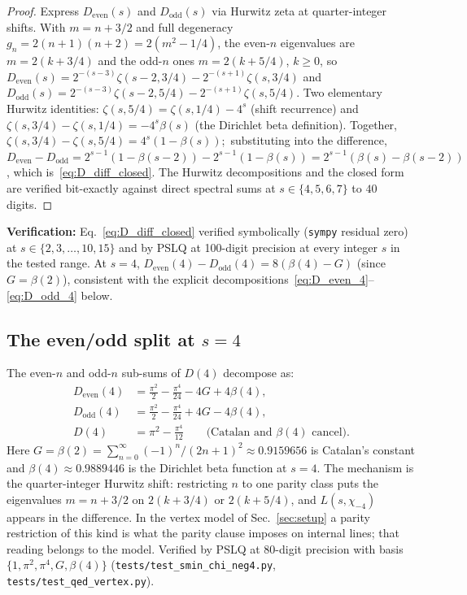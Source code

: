 \documentclass[11pt]{article}
\begin{document}
\begin{proof}
Express $D_{\mathrm{even}}(s)$ and $D_{\mathrm{odd}}(s)$ via Hurwitz
zeta at quarter-integer shifts.  With $m = n + 3/2$ and full
degeneracy $g_n = 2(n+1)(n+2) = 2(m^2 - 1/4)$, the even-$n$
eigenvalues are $m = 2(k + 3/4)$ and the odd-$n$ ones
$m = 2(k + 5/4)$, $k \ge 0$, so
$D_{\mathrm{even}}(s) = 2^{-(s-3)} \zeta(s{-}2, 3/4)
                       - 2^{-(s+1)} \zeta(s, 3/4)$
and
$D_{\mathrm{odd}}(s) = 2^{-(s-3)} \zeta(s{-}2, 5/4)
                       - 2^{-(s+1)} \zeta(s, 5/4)$.
Two elementary Hurwitz identities:
$\zeta(s, 5/4) = \zeta(s, 1/4) - 4^s$ (shift recurrence) and
$\zeta(s, 3/4) - \zeta(s, 1/4) = -4^s \beta(s)$ (the Dirichlet
beta definition).  Together,
$\zeta(s, 3/4) - \zeta(s, 5/4) = 4^s(1 - \beta(s))$;\ substituting
into the difference,
$D_{\mathrm{even}} - D_{\mathrm{odd}}
 = 2^{s-1}(1 - \beta(s{-}2)) - 2^{s-1}(1 - \beta(s))
 = 2^{s-1}(\beta(s) - \beta(s{-}2))$,
which is~\eqref{eq:D_diff_closed}.  The Hurwitz decompositions and
the closed form are verified bit-exactly against direct spectral sums
at $s \in \{4, 5, 6, 7\}$ to $40$ digits.
\end{proof}

\noindent\textbf{Verification:}
Eq.~\eqref{eq:D_diff_closed} verified symbolically (\texttt{sympy}
residual zero) at $s \in \{2, 3, \ldots, 10, 15\}$ and by PSLQ at
100-digit precision at every integer $s$ in the tested range.  At $s=4$,
$D_{\mathrm{even}}(4) - D_{\mathrm{odd}}(4) = 8(\beta(4) - G)$
(since $G = \beta(2)$), consistent with the explicit
decompositions~\eqref{eq:D_even_4}--\eqref{eq:D_odd_4} below.

\subsection{The even/odd split at $s = 4$}

The even-$n$ and odd-$n$ sub-sums of $D(4)$ decompose as:
\begin{align}
  D_{\mathrm{even}}(4)
    &= \tfrac{\pi^2}{2} - \tfrac{\pi^4}{24}
       - 4G + 4\beta(4),
  \label{eq:D_even_4} \\
  D_{\mathrm{odd}}(4)
    &= \tfrac{\pi^2}{2} - \tfrac{\pi^4}{24}
       + 4G - 4\beta(4),
  \label{eq:D_odd_4} \\
  D(4) &= \pi^2 - \tfrac{\pi^4}{12}
  \qquad\text{(Catalan and $\beta(4)$ cancel)}.
  \label{eq:D_full}
\end{align}
Here $G = \beta(2) = \sum_{n=0}^{\infty} (-1)^n/(2n+1)^2 \approx
0.9159656$ is Catalan's constant and $\beta(4) \approx 0.9889446$ is the
Dirichlet beta function at $s=4$.  The mechanism is the
quarter-integer Hurwitz shift: restricting $n$ to one parity class puts
the eigenvalues $m = n + 3/2$ on $2(k + 3/4)$ or $2(k + 5/4)$, and
$L(s, \chi_{-4})$ appears in the difference.  In the vertex model of
Sec.~\ref{sec:setup} a parity restriction of this kind is what the
parity clause imposes on internal lines; that reading belongs to the
model.  Verified by PSLQ at 80-digit precision with basis
$\{1, \pi^2, \pi^4, G, \beta(4)\}$ (\texttt{tests/test\_smin\_chi\_neg4.py},
\texttt{tests/test\_qed\_vertex.py}).
\end{document}
